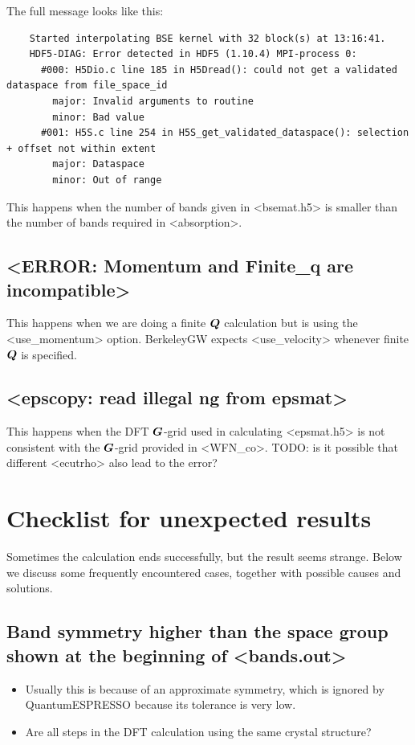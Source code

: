 \documentclass[hyperref, a4paper, 12pt]{report}
\def\texttt#1{<#1>}%
\newcommand{\shortcode}[1]{\texttt{#1}}
\begin{document}
The full message looks like this: 
\begin{lstlisting}
    Started interpolating BSE kernel with 32 block(s) at 13:16:41.
    HDF5-DIAG: Error detected in HDF5 (1.10.4) MPI-process 0:
      #000: H5Dio.c line 185 in H5Dread(): could not get a validated dataspace from file_space_id
        major: Invalid arguments to routine
        minor: Bad value
      #001: H5S.c line 254 in H5S_get_validated_dataspace(): selection + offset not within extent
        major: Dataspace
        minor: Out of range
\end{lstlisting}
This happens when the number of bands given in \shortcode{bsemat.h5} 
is smaller than the number of bands required in \shortcode{absorption}.

\subsection{\shortcode{ERROR: Momentum and Finite_q are incompatible}}

This happens when we are doing a finite $\vb*{Q}$ calculation 
but is using the \shortcode{use_momentum} option.
BerkeleyGW expects \shortcode{use_velocity} 
whenever finite $\vb*{Q}$ is specified.

\subsection{\shortcode{epscopy: read illegal ng from epsmat}}

This happens when the DFT $\vb*{G}$-grid used in calculating \shortcode{epsmat.h5} 
is not consistent with the $\vb*{G}$-grid provided in \shortcode{WFN_co}.
TODO: is it possible that different \shortcode{ecutrho} also lead to the error? 

\section{Checklist for unexpected results}

Sometimes the calculation ends successfully,
but the result seems strange.
Below we discuss some frequently encountered cases, 
together with possible causes and solutions. 

\subsection{Band symmetry higher than the space group shown at the beginning of \shortcode{bands.out}}

\begin{itemize}
    \item Usually this is because of an approximate symmetry,
    which is ignored by QuantumESPRESSO because its tolerance is very low.
    \item Are all steps in the DFT calculation using the same crystal structure?
\end{itemize}
\end{document}
